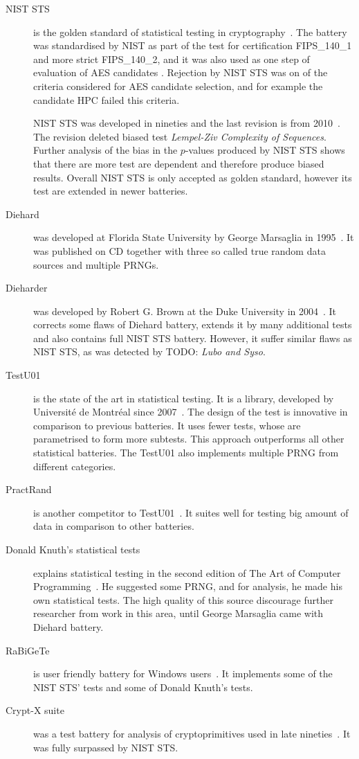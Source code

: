 \documentclass[
  print, %
  Table,   %
  nolof,     %
  nolot,     %
  11pt, %
  oneside  %
]{fithesis3}
\newcommand{\todo}[1]{TODO: \textit{#1}}
\begin{document}
\begin{description}
    \item[NIST STS] is the golden standard of statistical testing in cryptography~\cite{rukhin2001statistical}. The battery was standardised by NIST as part of the test for certification FIPS\_140\_1 and more strict FIPS\_140\_2, and it was also used as one step of evaluation of AES candidates \cite{murphy2000power}. Rejection by NIST STS was on of the criteria considered for AES candidate selection, and for example the candidate HPC failed this criteria.

    NIST STS was developed in nineties and the last revision is from 2010~\cite{rukhin2010niststs}. The revision deleted biased test \textit{Lempel-Ziv Complexity of Sequences}. Further analysis of the bias in the $p$-values produced by NIST STS shows that there are more test are dependent and therefore produce biased results. Overall NIST STS is only accepted as golden standard, however its test are extended in newer batteries. %
    \item[Diehard] was developed at Florida State University by George Marsaglia in 1995~\cite{marsaglia1996diehard}. It was published on CD together with three so called true random data sources and multiple PRNGs. %
    \item[Dieharder] was developed by Robert G. Brown at the Duke University in 2004~\cite{brown2013dieharder}. It corrects some flaws of Diehard battery, extends it by many additional tests and also contains full NIST STS battery. However, it suffer similar flaws as NIST STS, as was detected by \todo{Lubo and Syso}. %
    \item[TestU01] is the state of the art in statistical testing. It is a library, developed by Université de Montréal since 2007~\cite{l2007testu01}. The design of the test is innovative in comparison to previous batteries. It uses fewer tests, whose are parametrised to form more subtests. This approach outperforms all other statistical batteries. The TestU01 also implements multiple PRNG from different categories. %
    \item[PractRand] is another competitor to TestU01~\cite{dotypractically}. It suites well for testing big amount of data in comparison to other batteries.
    \item[Donald Knuth's statistical tests] explains statistical testing in the second edition of The Art of Computer Programming~\cite{knuth1969vol}. He suggested some PRNG, and for analysis, he made his own statistical tests. The high quality of this source discourage further researcher from work in this area, until George Marsaglia came with Diehard battery. %
    \item[RaBiGeTe] is user friendly battery for Windows users~\cite{rabigete}. It implements some of the NIST STS' tests and some of Donald Knuth's tests.
    \item[Crypt-X suite] was a test battery for analysis of cryptoprimitives used in late nineties~\cite{cryptxs}. It was fully surpassed by NIST STS. %
\end{description}
\end{document}

